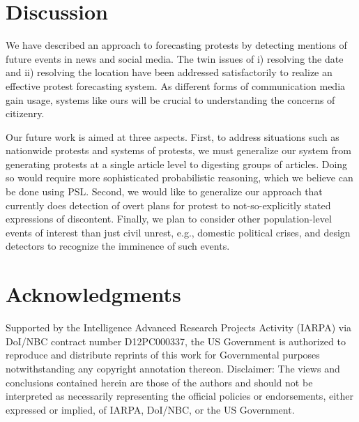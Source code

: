 \documentclass[letterpaper]{article}
\begin{document}
\section{Discussion}
We have described an approach to forecasting protests by detecting
mentions of future events in news and social media. The twin issues
of i) resolving the date and ii) resolving the location have been
addressed satisfactorily to realize an effective protest forecasting
system. As different forms of communication media gain usage, systems
like ours will be crucial to understanding the concerns of citizenry.

Our future work is aimed at three aspects. First, to address situations
such as nationwide protests and systems of protests, we must generalize
our system from generating protests at a single article level to
digesting groups of articles. Doing so would require more sophisticated
probabilistic reasoning, which we believe can be done using PSL.
Second, we would like to generalize our
approach that currently does detection of overt plans for protest to
not-so-explicitly stated expressions of discontent.  Finally, we plan to
consider other population-level events of interest than just civil
unrest, e.g., domestic political crises, and design detectors to
recognize the imminence of such events.

\section*{Acknowledgments}
Supported by the Intelligence Advanced Research Projects Activity (IARPA) via
DoI/NBC contract number D12PC000337, the US Government is authorized to
reproduce and distribute reprints of this work for Governmental purposes
notwithstanding any copyright annotation thereon.  Disclaimer: The views and
conclusions contained herein are those of the authors and should not be
interpreted as necessarily representing the official policies or endorsements,
either expressed or implied, of IARPA, DoI/NBC, or the US Government.


\end{document}
